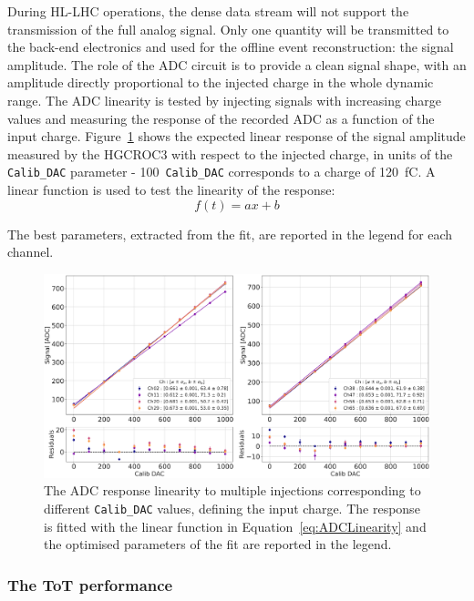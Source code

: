 During HL-LHC operations, the dense data stream will not support the transmission of the full analog signal. Only one quantity will be transmitted to the back-end electronics and used for the offline event reconstruction: the signal amplitude. The role of the ADC circuit is to provide a clean signal shape, with an amplitude directly proportional to the injected charge in the whole dynamic range.
The ADC linearity is tested by injecting signals with increasing charge values and measuring the response of the recorded ADC as a function of the input charge. Figure~\ref{fig:ADC_Injection} shows the expected linear response of the signal amplitude measured by the HGCROC3 with respect to the injected charge, in units of the \texttt{Calib\_DAC} parameter - 100~\texttt{Calib\_DAC} corresponds to a charge of 120~fC. A linear function is used to test the linearity of the response:
\begin{equation}
    f(t) = ax + b
\label{eq:ADCLinearity}
\end{equation}

The best parameters, extracted from the fit, are reported in the legend for each channel.

\begin{figure}
    \centering
    \includegraphics[width=0.7\linewidth]{Figures/HGCAL/ADC_Injection.pdf}
    \caption{The ADC response linearity to multiple injections corresponding to different \texttt{Calib\_DAC} values, defining the input charge. The  response is fitted with the linear function in Equation~\ref{eq:ADCLinearity} and the optimised parameters of the fit are reported in the legend.}
    \label{fig:ADC_Injection}
\end{figure}

\subsubsection{The ToT performance}
\label{subsubsec:The ToT performance}


